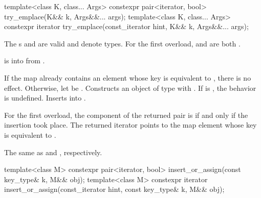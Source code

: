 %
\begin{itemdecl}
template<class K, class... Args>
  constexpr pair<iterator, bool> try_emplace(K&& k, Args&&... args);
template<class K, class... Args>
  constexpr iterator try_emplace(const_iterator hint, K&& k, Args&&... args);
\end{itemdecl}

\begin{itemdescr}
\pnum
\constraints
The s  and
 are valid and denote types.
For the first overload,
 and
 are both .

\pnum
\expects
{} is 
into  from
.

\pnum
\effects
If the map already contains an element whose key is equivalent to ,
there is no effect.
Otherwise, let  be .
Constructs an object  of type 
with .\newline
If  is ,
the behavior is undefined.
Inserts  into .

\pnum
\returns
For the first overload,
the  component of the returned pair is 
if and only if the insertion took place.
The returned iterator points to the map element
whose key is equivalent to .

\pnum
\complexity
The same as  and , respectively.
\end{itemdescr}

%
\begin{itemdecl}
template<class M>
  constexpr pair<iterator, bool> insert_or_assign(const key_type& k, M&& obj);
template<class M>
  constexpr iterator insert_or_assign(const_iterator hint, const key_type& k, M&& obj);
\end{itemdecl}

